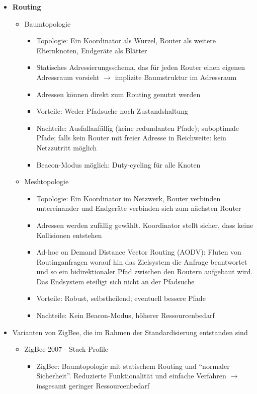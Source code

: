 \begin{itemize}
\begin{itemize}
		\item \textbf{Routing}
		\begin{itemize}
			\item Baumtopologie
			\begin{itemize}
				\item Topologie: Ein Koordinator als Wurzel, Router als weitere Elternknoten, Endgeräte als Blätter
				\item Statisches Adressierungsschema, das für jeden Router einen eigenen Adressraum vorsieht \(\rightarrow\) implizite Baumstruktur im Adressraum
				\item Adressen können direkt zum Routing genutzt werden
				\item Vorteile: Weder Pfadsuche noch Zustandshaltung
				\item Nachteile: Ausfallanfällig (keine redundanten Pfade); suboptimale Pfade; falls kein Router mit freier Adresse in Reichweite: kein Netzzutritt möglich
				\item Beacon-Modus möglich: Duty-cycling für alle Knoten
			\end{itemize}
			\item Meshtopologie
			\begin{itemize}
				\item Topologie: Ein Koordinator im Netzwerk, Router verbinden untereinander und Endgeräte verbinden sich zum nächsten Router
				\item Adressen werden zufällig gewählt. Koordinator stellt sicher, dass keine Kollisionen entstehen
				\item Ad-hoc on Demand Distance Vector Routing (AODV): Fluten von Routinganfragen worauf hin das Zielsystem die Anfrage beantwortet und so ein bidirektionaler Pfad zwischen den Routern aufgebaut wird. Das Endsystem eteiligt sich nicht an der Pfadsuche
				\item Vorteile: Robust, selbstheilend; eventuell bessere Pfade
				\item Nachteile: Kein Beacon-Modus, höherer Ressourcenbedarf
			\end{itemize}
		\end{itemize}
		\item Varianten von ZigBee, die im Rahmen der Standardisierung entstanden sind
		\begin{itemize}
			\item ZigBee 2007 - Stack-Profile
			\begin{itemize}
				\item ZigBee: Baumtopologie mit statischem Routing und "`normaler Sicherheit"'. Reduzierte Funktionalität und einfache Verfahren \(\rightarrow\) insgesamt geringer Ressourcenbedarf

\end{itemize}
\end{itemize}
\end{itemize}
\end{itemize}

